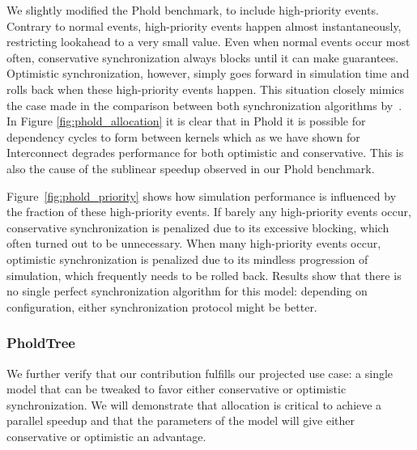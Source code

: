 We slightly modified the Phold benchmark, to include high-priority events.
Contrary to normal events, high-priority events happen almost instantaneously, restricting lookahead to a very small value.
Even when normal events occur most often, conservative synchronization always blocks until it can make guarantees.
Optimistic synchronization, however, simply goes forward in simulation time and rolls back when these high-priority events happen.
This situation closely mimics the case made in the comparison between both synchronization algorithms by~\cite{FujimotoBook}.
In Figure \ref{fig:phold_allocation} it is clear that in Phold it is possible for dependency cycles to form between kernels which as we have shown for Interconnect degrades performance for both optimistic and conservative. This is also the cause of the sublinear speedup observed in our Phold benchmark.

Figure~\ref{fig:phold_priority} shows how simulation performance is influenced by the fraction of these high-priority events.
If barely any high-priority events occur, conservative synchronization is penalized due to its excessive blocking, which often turned out to be unnecessary.
When many high-priority events occur, optimistic synchronization is penalized due to its mindless progression of simulation, which frequently needs to be rolled back.
Results show that there is no single perfect synchronization algorithm for this model: depending on configuration, either synchronization protocol might be better.


\subsubsection{PholdTree}
We further verify that our contribution fulfills our projected use case: a single model that can be tweaked to favor either conservative or optimistic synchronization. We will demonstrate that allocation is critical to achieve a parallel speedup and that the parameters of the model will give either conservative or optimistic an advantage.
